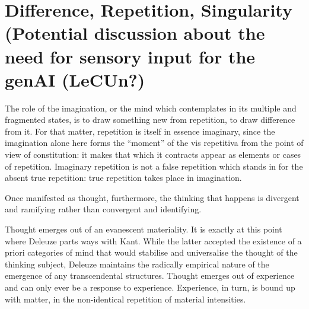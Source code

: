 \section{Difference, Repetition, Singularity (Potential discussion about the
  need for sensory input for the genAI (LeCUn?)}
The role of the imagination, or the mind which contemplates in its multiple and fragmented states, is to draw something new from repetition, to draw difference from it. For that matter, repetition is itself in essence imaginary, since the imagination alone here forms the “moment” of the vis repetitiva from the point of view of constitution: it makes that which it contracts appear as elements or cases of repetition. Imaginary repetition is not a false repetition which stands in for the absent true repetition: true repetition takes place in imagination. \cite{deleuze1994, kruger2021}

Once manifested as thought, furthermore, the thinking that happens is divergent and ramifying rather than convergent and identifying. \cite[175]{kruger2021}

Thought emerges out of an evanescent materiality. It is exactly at this point where Deleuze parts ways with Kant. While the latter accepted the existence of a priori categories of mind that would stabilise and universalise the thought of the thinking subject, Deleuze maintains the radically empirical nature of the emergence of any transcendental structures. Thought emerges out of experience and can only ever be a response to experience. Experience, in turn, is bound up with matter, in the non-identical repetition of material intensities. \cite[178]{kruger2021}

